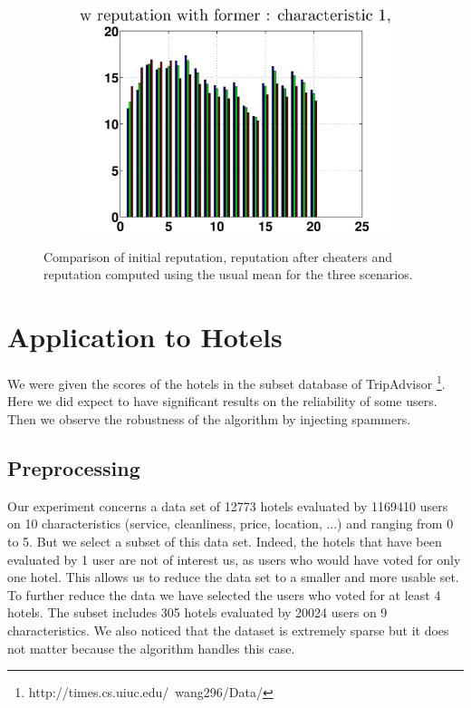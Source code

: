 \documentclass[12pt,a4paper]{article}
\begin{document}
\begin{figure}[!ht]
\begin{subfigure}[b]{0.32\textwidth}
\end{subfigure}
\begin{subfigure}[b]{0.32\textwidth}
\includegraphics[width = \textwidth]{cheaters/chcompareRepMixc1.eps}
\end{subfigure}
\caption{\label{finalCheat}Comparison of initial reputation, reputation after cheaters and reputation computed using the usual mean for the three scenarios.}
\end{figure}

\clearpage
\section{Application to Hotels}

We were given the scores of the hotels in the subset database of TripAdvisor \footnote{http://times.cs.uiuc.edu/~wang296/Data/}. Here we did  expect to have significant results on the reliability of some users. Then we observe the robustness of the algorithm by injecting spammers.

\subsection{Preprocessing}
Our experiment concerns a data set of 12773 hotels evaluated by 1169410 users on 10 characteristics (service, cleanliness, price, location, ...) and ranging from 0 to 5. But we select a subset of this data set. Indeed, the hotels that have been evaluated by 1 user are not of interest us, as users who would have voted for only one hotel. This allows us to reduce the data set to a smaller and more usable set. To further reduce the data we have selected the users who voted for at least 4 hotels. The subset includes 305 hotels evaluated by 20024 users on 9 characteristics. We also noticed that the dataset is extremely sparse but it does not matter because the algorithm handles this case.
\end{document}

